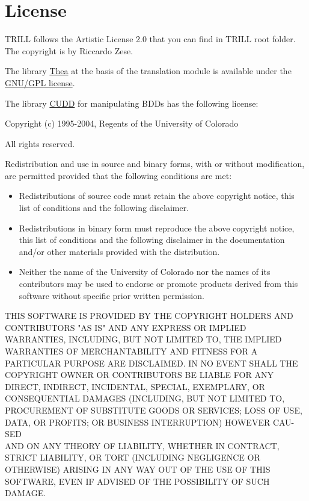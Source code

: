 \documentclass[a4paper,10pt]{scrartcl}
\begin{document}
\section{License}
\label{license}



TRILL follows the Artistic License 2.0 that you can find in TRILL root folder. The copyright is by Riccardo Zese.
\vspace{3mm}

The library \href{http://vangelisv.github.io/thea/}{Thea} at the basis of the translation module is available under the \href{http://www.gnu.org/copyleft/gpl.html}{GNU/GPL license}.

The library \href{http://vlsi.colorado.edu/\string ~fabio/}{CUDD} for manipulating BDDs has the following license:

\vspace{3mm}

Copyright (c) 1995-2004, Regents of the University of Colorado

All rights reserved.

Redistribution and use in source and binary forms, with or without
modification, are permitted provided that the following conditions
are met:

\begin{itemize}
\item
Redistributions of source code must retain the above copyright
notice, this list of conditions and the following disclaimer.
\item
Redistributions in binary form must reproduce the above copyright
notice, this list of conditions and the following disclaimer in the
documentation and/or other materials provided with the distribution.
\item
Neither the name of the University of Colorado nor the names of its
contributors may be used to endorse or promote products derived from
this software without specific prior written permission.
\end{itemize}
THIS SOFTWARE IS PROVIDED BY THE COPYRIGHT HOLDERS AND CONTRIBUTORS
"AS IS" AND ANY EXPRESS OR IMPLIED WARRAN\-TIES, INCLUDING, BUT NOT
LIMITED TO, THE IMPLIED WARRANTIES OF MERCHANTABILITY AND FITNESS
FOR A PARTICULAR PURPOSE ARE DISCLAIMED. IN NO EVENT SHALL THE
COPYRIGHT OWNER OR CONTRIBUTORS BE LIABLE FOR ANY DIRECT, INDIRECT,
INCIDENTAL, SPECIAL, EXEMPLARY, OR CONSEQUENTIAL DAMAGES (INCLUDING,
BUT NOT LIMITED TO, PROCUREMENT OF SUBSTITUTE GOODS OR SERVICES;
LOSS OF USE, DATA, OR PROFITS; OR BUSINESS INTERRUPTION) HOWEVER
CAU-SED
\\ AND ON ANY THEORY OF LIABILITY, WHETHER IN CONTRACT, STRICT
LIABILITY, OR TORT (INCLUDING NEGLIGENCE OR OTHERWISE) ARISING IN
ANY WAY OUT OF THE USE OF THIS SOFTWARE, EVEN IF ADVISED OF THE
POSSIBILITY OF SUCH DAMAGE.




\end{document}
